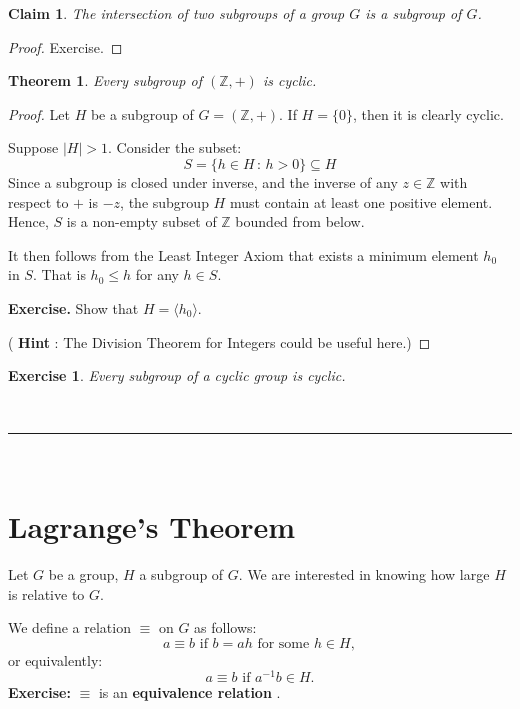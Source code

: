 \documentclass[a4paper,12pt]{report}
\newcommand{\abs}[1]{\left|#1\right|}
\newcounter{statement}
\numberwithin{statement}{chapter}
\newtheorem{thm}[statement]{Theorem}
\newtheorem{claim}[statement]{Claim}
\newtheorem{ex}[statement]{\bf Exercise}
\numberwithin{equation}{chapter}
\numberwithin{section}{chapter}
\numberwithin{subsection}{section}
\begin{document}
\begin{claim}
The intersection of two subgroups of a group $G$ is a subgroup of $G$.
\end{claim}
\begin{proof}
Exercise.
\end{proof}

\begin{thm}
Every subgroup of $(\mathbb{Z}, +)$ is cyclic.
\end{thm}
\begin{proof}

Let $H$ be a subgroup of $G = (\mathbb{Z}, +)$.
If $H = \{0\}$, then it is clearly cyclic.




Suppose $\abs{H} > 1$.  Consider the subset:
\[
S = \{h \in H \,:\, h > 0\} \subseteq H
\]
Since a subgroup is closed under inverse, 
and the inverse of any $z \in \mathbb{Z}$
with respect to $+$ is $-z$, the subgroup $H$ must contain at least one positive
element.  Hence, $S$ is a non-empty subset of $\mathbb{Z}$ bounded from below.




It then follows from the Least Integer Axiom that exists a minimum element $h_0$ in $S$.
That is $h_0 \leq h$ for any $h \in S$.




 {\bf Exercise.}  Show that $H = \langle h_0 \rangle$.



( {\bf Hint} : The Division Theorem for Integers could be useful here.)
\end{proof}
\begin{ex}
Every subgroup of a cyclic group is cyclic.
\end{ex}

\quad\\\hrule
\quad\\
\section*{Lagrange's Theorem}

Let $G$ be a group, $H$ a subgroup of $G$.
We are interested in knowing how large $H$ is relative to $G$.



We define a relation $\equiv$ on $G$ as follows:
\[
a \equiv b \text{ if } b = ah \text{ for some } h \in H,
\]
or equivalently:
\[
a \equiv b \text{ if } a^{-1}b \in H.
\]
 {\bf Exercise:}  $\equiv$ is an  {\bf equivalence relation} .
\end{document}
